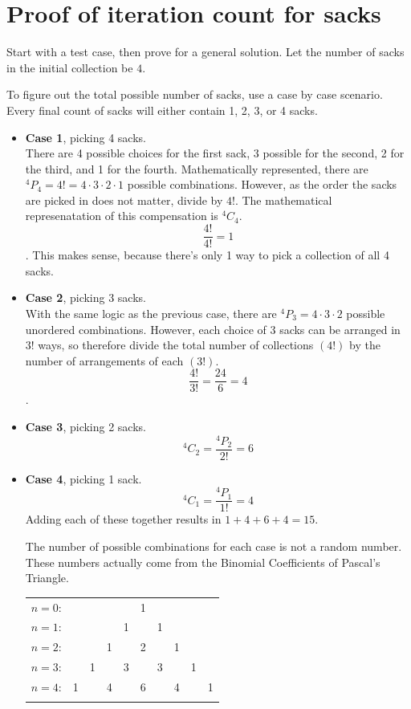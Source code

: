 \documentclass[10pt,journal,compsoc]{IEEEtran}
\newcommand*{\Perm}[2]{{}^{#1}\!P_{#2}}%
\newcommand*{\Comb}[2]{{}^{#1}C_{#2}}%
\begin{document}
\section{Proof of iteration count for sacks}
Start with a test case, then prove for a general solution. 
Let the number of sacks in the initial collection be $4$. 

To figure out the total possible number of sacks, use a case by case scenario. Every final count of sacks will either contain 1, 2, 3, or 4 sacks. 
\begin{itemize}
	\item \textbf{Case 1}, picking 4 sacks. \\
	There are 4 possible choices for the first sack, 3 possible for the second, 2 for the third, and 1 for the fourth. Mathematically represented, there are  $\Perm{4}{4} = 4! = 4\cdot3\cdot2\cdot1$ possible combinations. However, as the order the sacks are picked in does not matter, divide by $4!$. The mathematical represenatation of this compensation is $\Comb{4}{4}$. $$\frac{4!}{4!} = 1$$. This makes sense, because there's only 1 way to pick a collection of all 4 sacks. 
	\item \textbf{Case 2}, picking 3 sacks.\\
	With the same logic as the previous case, there are  $\Perm{4}{3} = 4\cdot3\cdot2$  possible unordered combinations. However, each choice of 3 sacks can be arranged in $3!$ ways, so therefore divide the total number of collections $(4!)$ by the number of arrangements of each $(3!)$. $$\frac{4!}{3!} = \frac{24}{6} = 4$$.
	\item \textbf{Case 3}, picking 2 sacks.\\
	\[\Comb{4}{2} = \frac{\Perm{4}{2}}{2!} = 6\]
	\item \textbf{Case 4}, picking 1 sack.\\
	\[\Comb{4}{1} = \frac{\Perm{4}{1}}{1!} = 4\]
	Adding each of these together results in $1+4+6+4 = 15$. 
	
	The number of possible combinations for each case is not a random number. These numbers actually come from the Binomial Coefficients of Pascal's Triangle. 
	\begin{tabular}{rccccccccc}
		$n=0$:&    &    &    &    &  1
		\\\noalign{\smallskip\smallskip}
		$n=1$:&    &    &    &  1 &    &  1\\\noalign{\smallskip\smallskip}
		$n=2$:&    &    &  1 &    &  2 &    &  1\\\noalign{\smallskip\smallskip}
		$n=3$:&    &  1 &    &  3 &    &  3 &    &  1\\\noalign{\smallskip\smallskip}
		$n=4$:&  1 &    &  4 &    &  6 &    &  4 &    &  1\\\noalign{\smallskip\smallskip}
	\end{tabular}
	

\end{itemize}
\end{document}
